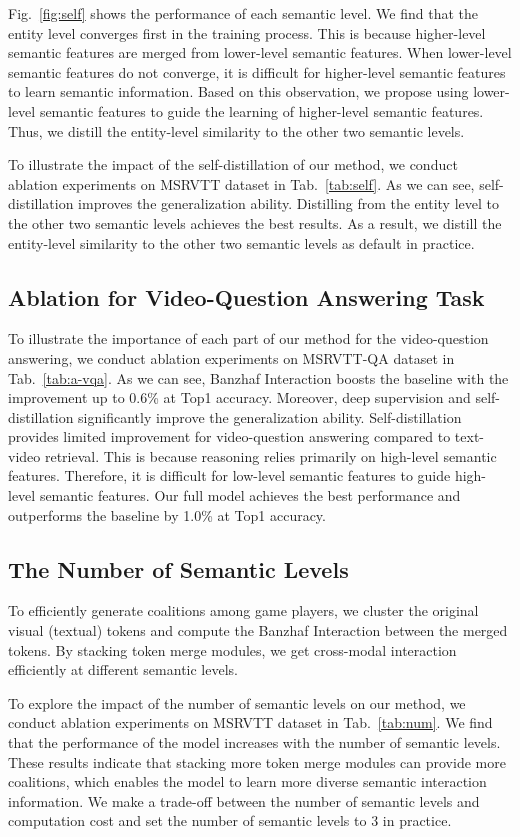 \documentclass[10pt,twocolumn,letterpaper]{article}
\begin{document}
{Fig.~\ref{fig:self} shows the performance of each semantic level. We find that the entity level converges first in the training process. This is because higher-level semantic features are merged from lower-level semantic features. When lower-level semantic features do not converge, it is difficult for higher-level semantic features to learn semantic information. Based on this observation, we propose using lower-level semantic features to guide the learning of higher-level semantic features. Thus, we distill the entity-level similarity to the other two semantic levels.

To illustrate the impact of the self-distillation of our method, we conduct ablation experiments on MSRVTT dataset in Tab.~\ref{tab:self}. As we can see, self-distillation improves the generalization ability. Distilling from the entity level to the other two semantic levels achieves the best results. As a result, we distill the entity-level similarity to the other two semantic levels as default in practice.

\subsection{Ablation for Video-Question Answering Task}
To illustrate the importance of each part of our method for the video-question answering, we conduct ablation experiments on MSRVTT-QA dataset in Tab.~\ref{tab:a-vqa}. As we can see, Banzhaf Interaction boosts the baseline with the improvement up to 0.6\% at Top1 accuracy. Moreover, deep supervision and self-distillation significantly improve the generalization ability. Self-distillation provides limited improvement for video-question answering compared to text-video retrieval. This is because reasoning relies primarily on high-level semantic features. Therefore, it is difficult for low-level semantic features to guide high-level semantic features. Our full model achieves the best performance and outperforms the baseline by 1.0\% at Top1 accuracy.

\subsection{The Number of Semantic Levels}
To efficiently generate coalitions among game players, we cluster the original visual (textual) tokens and compute the Banzhaf Interaction between the merged tokens. By stacking token merge modules, we get cross-modal interaction efficiently at different semantic levels.

To explore the impact of the number of semantic levels on our method, we conduct ablation experiments on MSRVTT dataset in Tab.~\ref{tab:num}. We find that the performance of the model increases with the number of semantic levels. These results indicate that stacking more token merge modules can provide more coalitions, which enables the model to learn more diverse semantic interaction information. We make a trade-off between the number of semantic levels and computation cost and set the number of semantic levels to 3 in practice.

}
\end{document}
